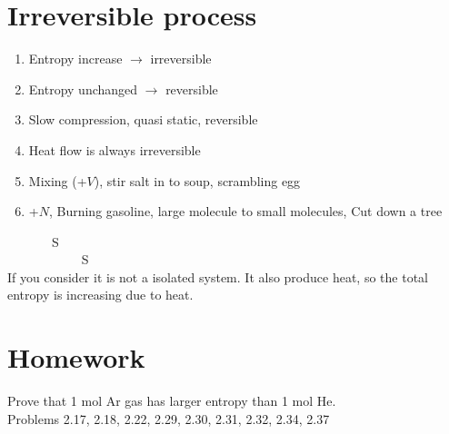 \section{Irreversible process}
\begin{enumerate}
\item Entropy increase $\rightarrow$ irreversible
\item Entropy unchanged $\rightarrow$ reversible
\item Slow compression, quasi static, reversible
\item Heat flow is always irreversible
\item Mixing (+$V$), stir salt in to soup, scrambling egg
\item +$N$, Burning gasoline, large molecule to small molecules, Cut down a tree
\end{enumerate}

 ~~~~~~~S\\
~~~~~~~~~~~ S\\
If you consider it is not a isolated system. It also produce heat, so the total entropy is increasing due to heat.

\section{Homework}
Prove that 1 mol Ar gas has larger entropy than 1 mol He.\\
Problems 2.17, 2.18, 2.22, 2.29, 2.30, 2.31, 2.32, 2.34, 2.37


